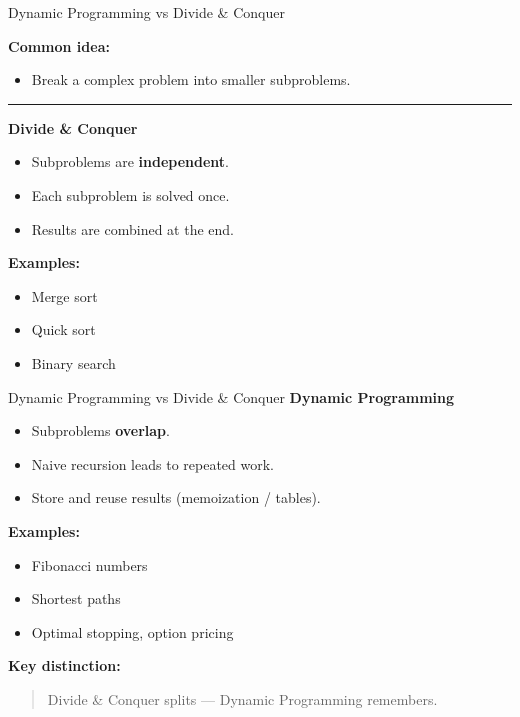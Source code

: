 \documentclass[aspectratio=169]{beamer}
\begin{document}
\begin{frame}{Dynamic Programming vs Divide \& Conquer}

\textbf{Common idea:}
\begin{itemize}
  \item Break a complex problem into smaller subproblems.\pause
\end{itemize}

\medskip
\hrule
\medskip

\textbf{Divide \& Conquer}
\begin{itemize}
  \item Subproblems are \textbf{independent}.\pause
  \item Each subproblem is solved once.\pause
  \item Results are combined at the end.\pause
\end{itemize}

\medskip
\textbf{Examples:}
\begin{itemize}
  \item Merge sort\pause
  \item Quick sort\pause
  \item Binary search
\end{itemize}
\end{frame}


\begin{frame}{Dynamic Programming vs Divide \& Conquer}
\textbf{Dynamic Programming}
\begin{itemize}
  \item Subproblems \textbf{overlap}.\pause
  \item Naive recursion leads to repeated work.\pause
  \item Store and reuse results (memoization / tables).\pause
\end{itemize}

\medskip
\textbf{Examples:}
\begin{itemize}
  \item Fibonacci numbers\pause
  \item Shortest paths\pause
  \item Optimal stopping, option pricing\pause
\end{itemize}

\medskip
\textbf{Key distinction:}
\begin{quote}
Divide \& Conquer splits — Dynamic Programming remembers.
\end{quote}

\end{frame}
\end{document}
